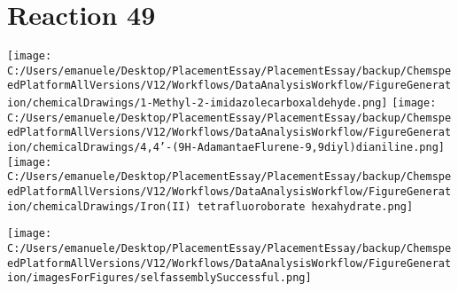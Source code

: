 \documentclass{article}%
\begin{document}
\section*{Reaction 49}%
%
\begin{scheme}[H]%
\begin{minipage}{0.5\textwidth}%
\texttt{[image: C:/Users/emanuele/Desktop/PlacementEssay/PlacementEssay/backup/ChemspeedPlatformAllVersions/V12/Workflows/DataAnalysisWorkflow/FigureGeneration/chemicalDrawings/1-Methyl-2-imidazolecarboxaldehyde.png]}%
\texttt{[image: C:/Users/emanuele/Desktop/PlacementEssay/PlacementEssay/backup/ChemspeedPlatformAllVersions/V12/Workflows/DataAnalysisWorkflow/FigureGeneration/chemicalDrawings/4,4'-(9H-AdamantaeFlurene-9,9diyl)dianiline.png]}%
\texttt{[image: C:/Users/emanuele/Desktop/PlacementEssay/PlacementEssay/backup/ChemspeedPlatformAllVersions/V12/Workflows/DataAnalysisWorkflow/FigureGeneration/chemicalDrawings/Iron(II) tetrafluoroborate hexahydrate.png]}%
\end{minipage}%
\begin{minipage}{0.5\textwidth}%
\begin{center}%
\texttt{[image: C:/Users/emanuele/Desktop/PlacementEssay/PlacementEssay/backup/ChemspeedPlatformAllVersions/V12/Workflows/DataAnalysisWorkflow/FigureGeneration/imagesForFigures/selfassemblySuccessful.png]}%
\end{center}%
\end{minipage}%
\caption{Self-assembly of components 12, 13, with Iron(II) in a 3.0:1.5:1.0 molar ratio in CH$_3$CN at 60\textdegree C for 40h. These are the reagents (starting materials) for reaction 49.}%
\end{scheme}%
\end{document}
